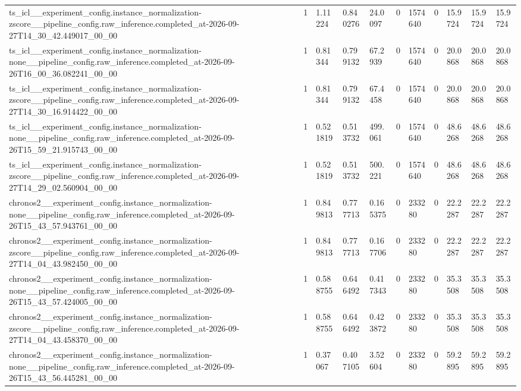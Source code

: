 \begin{tabular}{lllllllllll}
ts\_icl\_\_experiment\_config.instance\_normalization-zscore\_\_pipeline\_config.raw\_inference.completed\_at-2026-09-27T14\_30\_42.449017\_00\_00 & 1 & 1.11224 & 0.840276 & 24.0097 & 0 & 1574640 & 0 & 15.9724 & 15.9724 & 15.9724 \\
ts\_icl\_\_experiment\_config.instance\_normalization-none\_\_pipeline\_config.raw\_inference.completed\_at-2026-09-26T16\_00\_36.082241\_00\_00 & 1 & 0.81344 & 0.799132 & 67.2939 & 0 & 1574640 & 0 & 20.0868 & 20.0868 & 20.0868 \\
ts\_icl\_\_experiment\_config.instance\_normalization-zscore\_\_pipeline\_config.raw\_inference.completed\_at-2026-09-27T14\_30\_16.914422\_00\_00 & 1 & 0.81344 & 0.799132 & 67.4458 & 0 & 1574640 & 0 & 20.0868 & 20.0868 & 20.0868 \\
ts\_icl\_\_experiment\_config.instance\_normalization-none\_\_pipeline\_config.raw\_inference.completed\_at-2026-09-26T15\_59\_21.915743\_00\_00 & 1 & 0.521819 & 0.513732 & 499.061 & 0 & 1574640 & 0 & 48.6268 & 48.6268 & 48.6268 \\
ts\_icl\_\_experiment\_config.instance\_normalization-zscore\_\_pipeline\_config.raw\_inference.completed\_at-2026-09-27T14\_29\_02.560904\_00\_00 & 1 & 0.521819 & 0.513732 & 500.221 & 0 & 1574640 & 0 & 48.6268 & 48.6268 & 48.6268 \\
chronos2\_\_experiment\_config.instance\_normalization-none\_\_pipeline\_config.raw\_inference.completed\_at-2026-09-26T15\_43\_57.943761\_00\_00 & 1 & 0.849813 & 0.777713 & 0.165375 & 0 & 233280 & 0 & 22.2287 & 22.2287 & 22.2287 \\
chronos2\_\_experiment\_config.instance\_normalization-zscore\_\_pipeline\_config.raw\_inference.completed\_at-2026-09-27T14\_04\_43.982450\_00\_00 & 1 & 0.849813 & 0.777713 & 0.167706 & 0 & 233280 & 0 & 22.2287 & 22.2287 & 22.2287 \\
chronos2\_\_experiment\_config.instance\_normalization-none\_\_pipeline\_config.raw\_inference.completed\_at-2026-09-26T15\_43\_57.424005\_00\_00 & 1 & 0.588755 & 0.646492 & 0.417343 & 0 & 233280 & 0 & 35.3508 & 35.3508 & 35.3508 \\
chronos2\_\_experiment\_config.instance\_normalization-zscore\_\_pipeline\_config.raw\_inference.completed\_at-2026-09-27T14\_04\_43.458370\_00\_00 & 1 & 0.588755 & 0.646492 & 0.423872 & 0 & 233280 & 0 & 35.3508 & 35.3508 & 35.3508 \\
chronos2\_\_experiment\_config.instance\_normalization-none\_\_pipeline\_config.raw\_inference.completed\_at-2026-09-26T15\_43\_56.445281\_00\_00 & 1 & 0.37067 & 0.407105 & 3.52604 & 0 & 233280 & 0 & 59.2895 & 59.2895 & 59.2895 \\

\end{tabular}
